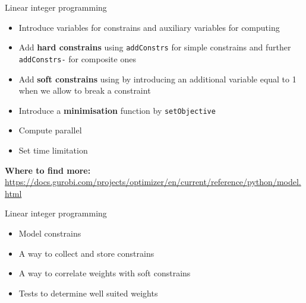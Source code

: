 \documentclass[10pt]{beamer}
\begin{document}
\begin{frame}{Linear integer programming}
    \begin{itemize}\Large\textbf{What are we able to do}\normalsize
        \item Introduce variables for constrains and auxiliary variables for computing
        \item Add \textbf{hard constrains} using \texttt{addConstrs} for simple constrains and further \texttt{addConstrs-} for composite ones
        \item Add \textbf{soft constrains} using by introducing an additional variable equal to 1 when we allow to break a constraint
        \item Introduce a \textbf{minimisation} function by \texttt{setObjective}
        \item Compute parallel
        \item Set time limitation
    \end{itemize}
    \bigskip 
    \textbf{Where to find more:} \url{https://docs.gurobi.com/projects/optimizer/en/current/reference/python/model.html}
\end{frame}

\begin{frame}{Linear integer programming}
\begin{itemize}\Large\textbf{What we need to implement}\normalsize
    \item Model constrains
    \item A way to collect and store constrains
    \item A way to correlate weights with soft constrains
    \item Tests to determine well suited weights
\end{itemize}
    
\end{frame}


        
\end{document}
